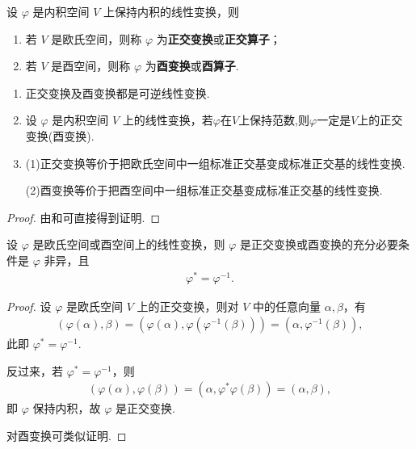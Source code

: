 \documentclass[../../main.tex]{subfiles}
\begin{document}
\begin{definition}
设 $\varphi$ 是内积空间 $V$ 上保持内积的线性变换，则
\begin{enumerate}
\item 若 $V$ 是欧氏空间，则称 $\varphi$ 为\textbf{正交变换}或\textbf{正交算子}；

\item 若 $V$ 是酉空间，则称 $\varphi$ 为\textbf{酉变换}或\textbf{酉算子}.
\end{enumerate}
\end{definition}

\begin{theorem}\label{theorem:正交变换和酉变换的基本性质}
\begin{enumerate}
\item 正交变换及酉变换都是可逆线性变换.

\item 设 $\varphi$ 是内积空间 $V$ 上的线性变换，若$\varphi$在$V$上保持范数,则$\varphi$一定是$V$上的正交变换(酉变换).

\item (1)正交变换等价于把欧氏空间中一组标准正交基变成标准正交基的线性变换.

(2)酉变换等价于把酉空间中一组标准正交基变成标准正交基的线性变换.
\end{enumerate}
\end{theorem}
\begin{proof}
由和可直接得到证明.

\end{proof}

\begin{theorem}\label{theorem:正交变换或酉变换g关于伴随算子的充要条件}
设 $\varphi$ 是欧氏空间或酉空间上的线性变换，则 $\varphi$ 是正交变换或酉变换的充分必要条件是 $\varphi$ 非异，且
\begin{align*}
\varphi^* = \varphi^{-1}.
\end{align*}
\end{theorem}
\begin{proof}
设 $\varphi$ 是欧氏空间 $V$ 上的正交变换，则对 $V$ 中的任意向量 $\alpha,\beta$，有
\begin{align*}
(\varphi(\alpha),\beta) = (\varphi(\alpha),\varphi(\varphi^{-1}(\beta))) = (\alpha,\varphi^{-1}(\beta)),
\end{align*}
此即 $\varphi^* = \varphi^{-1}$.

反过来，若 $\varphi^* = \varphi^{-1}$，则
\begin{align*}
(\varphi(\alpha),\varphi(\beta)) = (\alpha,\varphi^*\varphi(\beta)) = (\alpha,\beta),
\end{align*}
即 $\varphi$ 保持内积，故 $\varphi$ 是正交变换.

对酉变换可类似证明.

\end{proof}
\end{document}
